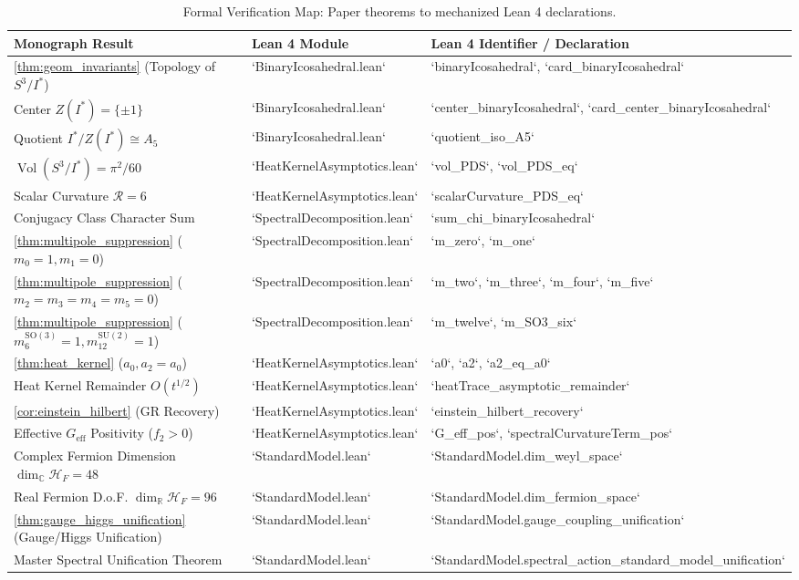 \documentclass[11pt,a4paper]{article}
\theoremstyle{definition}
\newcommand{\R}{\mathbb{R}}
\newcommand{\C}{\mathbb{C}}
\newcommand{\SU}{\mathrm{SU}}
\newcommand{\SO}{\mathrm{SO}}
\newcommand{\vol}{\operatorname{Vol}}
\newcommand{\PDS}{S^3 / I^*}
\newcommand{\Istar}{I^*}
\newcommand{\cH}{\mathcal{H}}
\newcommand{\cR}{\mathcal{R}}
\begin{document}
\begin{table}[h]
\centering
\caption{Formal Verification Map: Paper theorems to mechanized Lean 4 declarations.}
\label{tab:lean_theorems}
\small
\begin{tabular}{lll}
\toprule
Monograph Result & Lean 4 Module & Lean 4 Identifier / Declaration \\
\midrule
\cref{thm:geom_invariants} (Topology of $\PDS$) & `BinaryIcosahedral.lean` & `binaryIcosahedral`, `card_binaryIcosahedral` \\
Center $Z(\Istar) = \{\pm 1\}$ & `BinaryIcosahedral.lean` & `center_binaryIcosahedral`, `card_center_binaryIcosahedral` \\
Quotient $\Istar/Z(\Istar) \cong A_5$ & `BinaryIcosahedral.lean` & `quotient_iso_A5` \\
$\vol(\PDS) = \pi^2/60$ & `HeatKernelAsymptotics.lean` & `vol_PDS`, `vol_PDS_eq` \\
Scalar Curvature $\cR = 6$ & `HeatKernelAsymptotics.lean` & `scalarCurvature_PDS_eq` \\
Conjugacy Class Character Sum & `SpectralDecomposition.lean` & `sum_chi_binaryIcosahedral` \\
\cref{thm:multipole_suppression} ($m_0 = 1, m_1 = 0$) & `SpectralDecomposition.lean` & `m_zero`, `m_one` \\
\cref{thm:multipole_suppression} ($m_2=m_3=m_4=m_5=0$) & `SpectralDecomposition.lean` & `m_two`, `m_three`, `m_four`, `m_five` \\
\cref{thm:multipole_suppression} ($m_6^{\SO(3)} = 1, m_{12}^{\SU(2)} = 1$) & `SpectralDecomposition.lean` & `m_twelve`, `m_SO3_six` \\
\cref{thm:heat_kernel} ($a_0, a_2 = a_0$) & `HeatKernelAsymptotics.lean` & `a0`, `a2`, `a2_eq_a0` \\
Heat Kernel Remainder $O(t^{1/2})$ & `HeatKernelAsymptotics.lean` & `heatTrace_asymptotic_remainder` \\
\cref{cor:einstein_hilbert} (GR Recovery) & `HeatKernelAsymptotics.lean` & `einstein_hilbert_recovery` \\
Effective $G_{\mathrm{eff}}$ Positivity ($f_2 > 0$) & `HeatKernelAsymptotics.lean` & `G_eff_pos`, `spectralCurvatureTerm_pos` \\
Complex Fermion Dimension $\dim_\C \cH_F = 48$ & `StandardModel.lean` & `StandardModel.dim_weyl_space` \\
Real Fermion D.o.F. $\dim_\R \cH_F = 96$ & `StandardModel.lean` & `StandardModel.dim_fermion_space` \\
\cref{thm:gauge_higgs_unification} (Gauge/Higgs Unification) & `StandardModel.lean` & `StandardModel.gauge_coupling_unification` \\
Master Spectral Unification Theorem & `StandardModel.lean` & `StandardModel.spectral_action_standard_model_unification` \\
\bottomrule
\end{tabular}
\end{table}
\end{document}
